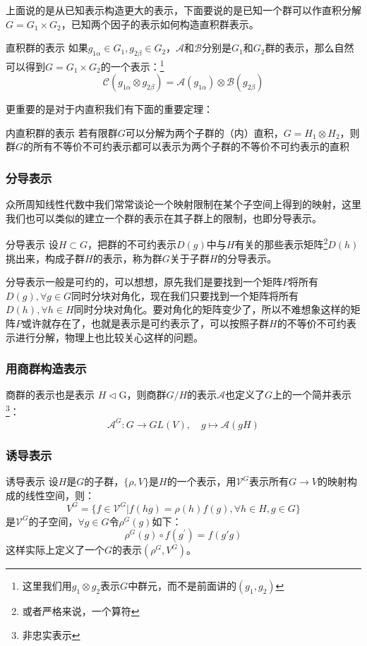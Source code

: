 上面说的是从已知表示构造更大的表示，下面要说的是已知一个群可以作直积分解$G=G_1\times G_2$，已知两个因子的表示如何构造直积群表示。
\begin{define}{直积群的表示}
	如果$g_{1\alpha}\in G_1,g_{2\beta}\in G_2$，$\mathscr{A}$和$\mathscr{B}$分别是$G_1$和$G_2$群的表示，那么自然可以得到$G=G_1\times G_2$的一个表示：\footnote{这里我们用$g_1\otimes g_2$表示$G$中群元，而不是前面讲的$(g_1,g_2)$}
	\[\mathscr{C}(g_{1\alpha}\otimes g_{2\beta})=\mathscr{A}(g_{1\alpha})\otimes\mathscr{B}(g_{2\beta})\]
\end{define}
更重要的是对于内直积我们有下面的重要定理：
\begin{theorem}{内直积群的表示}
	若有限群$G$可以分解为两个子群的（内）直积，$G=H_1\otimes H_2$，则群$G$的所有不等价不可约表示都可以表示为两个子群的不等价不可约表示的直积
\end{theorem}

\subsubsection{分导表示}
众所周知线性代数中我们常常谈论一个映射限制在某个子空间上得到的映射，这里我们也可以类似的建立一个群的表示在其子群上的限制，也即分导表示。
\begin{define}{分导表示}
	设$H\subset G$，把群的不可约表示$D(g)$中与$H$有关的那些表示矩阵\footnote{或者严格来说，一个算符}$D(h)$挑出来，构成子群$H$的表示，称为群$G$关于子群$H$的分导表示。
\end{define}

分导表示一般是可约的，可以想想，原先我们是要找到一个矩阵$P$将所有$D(g),\forall g\in G$同时分块对角化，现在我们只要找到一个矩阵将所有$D(h),\forall h\in H$同时分块对角化。要对角化的矩阵变少了，所以不难想象这样的矩阵$P$或许就存在了，也就是表示是可约表示了，可以按照子群$H$的不等价不可约表示进行分解，物理上也比较关心这样的问题。

\subsubsection{用商群构造表示}
\begin{theorem}{商群的表示也是表示}
	$H\lhd$G，则商群$G/H$的表示$\mathscr{A}$也定义了$G$上的一个简并表示\footnote{非忠实表示}：\[\mathscr{A}^G:G\to GL(V),\quad g\mapsto \mathscr{A}(gH)\]
\end{theorem}

\subsubsection*{诱导表示}
\begin{define}{诱导表示}
	设$H$是$G$的子群，$\{\rho,V\}$是$H$的一个表示，用$\mathcal{V}^G$表示所有$G\to V$的映射构成的线性空间，则：
	\[V^G=\{f\in\mathcal{V}^G|f(hg)=\rho(h)f(g),\forall h\in H,g\in G\}\]
	是$\mathcal{V}^G$的子空间，$\forall g\in G$令$\rho^G(g)$如下：
	\[\rho^G(g)\circ f(g^\prime)=f(g\prime g)\]
	这样实际上定义了一个$G$的表示$(\rho^G,V^G)$。
\end{define}



